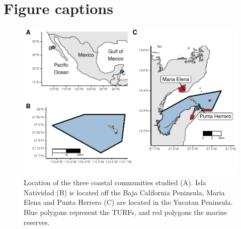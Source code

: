 \documentclass{frontiersSCNS}
\theoremstyle{definition}
\theoremstyle{definition}
\theoremstyle{definition}
\theoremstyle{remark}
\begin{document}
\clearpage



\clearpage

\section*{Figure captions}

\begin{figure}
\centering
\includegraphics{Villasenor-Derbez_files/figure-latex/unnamed-chunk-7-1.pdf}
\caption{\label{fig:unnamed-chunk-7}\label{fig:map}Location of the three
coastal communities studied (A). Isla Natividad (B) is located off the
Baja California Peninsula, Maria Elena and Punta Herrero (C) are located
in the Yucatan Peninsula. Blue polygons represent the TURFs, and red
polygons the marine reserves.}
\end{figure}
\end{document}
